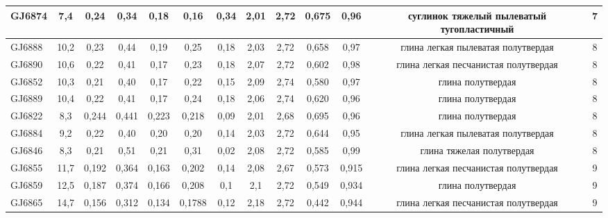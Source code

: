 \begin{sidewaystable}[p]
\begin{tabular}{@{}lcccccccccccc@{}}
    GJ6874          & 7,4        & 0,24                         & 0,34   & 0,18   & 0,16   & 0,34     & 2,01     & 2,72      & 0,675   & 0,96     & суглинок тяжелый   пылеватый тугопластичный  & 7   \\ \hline
    GJ6888          & 10,2       & 0,23                         & 0,44   & 0,19   & 0,25   & 0,18     & 2,03     & 2,72      & 0,658   & 0,97     & глина легкая   пылеватая полутвердая         & 8   \\ \hline
    GJ6890          & 10,6       & 0,22                         & 0,41   & 0,17   & 0,23   & 0,18     & 2,07     & 2,72      & 0,602   & 0,98     & глина легкая   песчанистая полутвердая       & 8   \\ \hline
    GJ6852          & 10,3       & 0,21                         & 0,40   & 0,17   & 0,22   & 0,15     & 2,09     & 2,74      & 0,580   & 0,97     & глина полутвердая                            & 8   \\ \hline
    GJ6889          & 10,4       & 0,22                         & 0,41   & 0,17   & 0,24   & 0,18     & 2,06     & 2,74      & 0,620   & 0,96     & глина полутвердая                            & 8   \\ \hline
    GJ6822          & 8,3        & 0,244                        & 0,441  & 0,223  & 0,218  & 0,09     & 2,01     & 2,68      & 0,695   & 0,96     & глина полутвердая                            & 8   \\ \hline
    GJ6884          & 9,2        & 0,22                         & 0,40   & 0,20   & 0,20   & 0,14     & 2,03     & 2,72      & 0,644   & 0,95     & глина легкая   пылеватая полутвердая         & 8   \\ \hline
    GJ6846          & 8,3        & 0,21                         & 0,51   & 0,21   & 0,31   & 0,02     & 2,08     & 2,72      & 0,585   & 0,99     & глина тяжелая   полутвердая                  & 8   \\ \hline
    GJ6855          & 11,7       & 0,192                        & 0,364  & 0,163  & 0,202  & 0,14     & 2,08     & 2,67      & 0,573   & 0,915    & глина легкая   песчанистая полутвердая       & 9   \\ \hline
    GJ6859          & 12,5       & 0,187                        & 0,374  & 0,166  & 0,208  & 0,1      & 2,1      & 2,72      & 0,549   & 0,934    & глина полутвердая                            & 9   \\ \hline
    GJ6865          & 14,7       & 0,156                        & 0,312  & 0,134  & 0,1788 & 0,12     & 2,18     & 2,72      & 0,442   & 0,944    & глина легкая   песчанистая полутвердая       & 9   \\ \hline

\end{tabular}
\end{sidewaystable}
